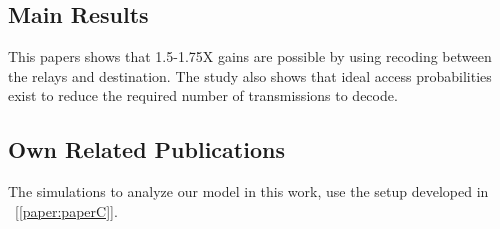 \subsection*{Main Results}
This papers shows that 1.5-1.75X gains are possible by using recoding between the relays and destination. The study also shows that ideal access probabilities exist to reduce the required number of transmissions to decode.

\subsection*{Own Related Publications}
The simulations to analyze our model in this work, use the setup developed in ~[\ref{paper:paperC}].

\clearpage
